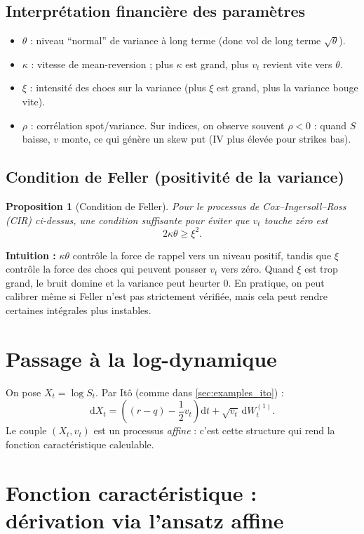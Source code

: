 \documentclass[11pt,a4paper]{report}
\newcommand{\dd}{\mathrm{d}}
\newcommand{\1}{\mathbbm{1}}
\theoremstyle{definition}
\theoremstyle{plain}
\newtheorem{proposition}{Proposition}[chapter]
\theoremstyle{remark}
\begin{document}
\subsection{Interprétation financière des paramètres}
\begin{itemize}
  \item $\theta$ : niveau ``normal'' de variance à long terme (donc vol de long terme $\sqrt{\theta}$).
  \item $\kappa$ : vitesse de mean-reversion ; plus $\kappa$ est grand, plus $v_t$ revient vite vers $\theta$.
  \item $\xi$ : intensité des chocs sur la variance (plus $\xi$ est grand, plus la variance bouge vite).
  \item $\rho$ : corrélation spot/variance.
  Sur indices, on observe souvent $\rho<0$ : quand $S$ baisse, $v$ monte, ce qui génère un skew put (IV plus élevée pour strikes bas).
\end{itemize}

\subsection{Condition de Feller (positivité de la variance)}
\begin{proposition}[Condition de Feller]
Pour le processus de Cox--Ingersoll--Ross (CIR) ci-dessus, une condition suffisante pour éviter que $v_t$ touche zéro est
\[
2\kappa\theta \ge \xi^2.
\]
\end{proposition}

\textbf{Intuition :}
$\kappa\theta$ contrôle la force de rappel vers un niveau positif,
tandis que $\xi$ contrôle la force des chocs qui peuvent pousser $v_t$ vers zéro.
Quand $\xi$ est trop grand, le bruit domine et la variance peut heurter 0.
En pratique, on peut calibrer même si Feller n'est pas strictement vérifiée, mais cela peut rendre certaines intégrales plus instables.

\section{Passage à la log-dynamique}
On pose $X_t=\log S_t$.
Par Itô (comme dans \cref{sec:examples_ito}) :
\[
\dd X_t = \left((r-q)-\frac12 v_t\right)\dd t + \sqrt{v_t}\,\dd W_t^{(1)}.
\]
Le couple $(X_t,v_t)$ est un processus \emph{affine} : c'est cette structure qui rend la fonction caractéristique calculable.

\section{Fonction caractéristique : dérivation via l'ansatz affine}
\label{sec:heston_cf}
\end{document}
